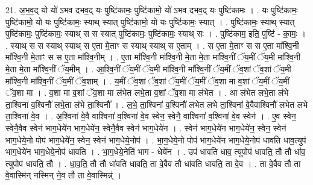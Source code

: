 \documentclass[17pt]{extarticle}
\begin{document}
21. अ॒भ॒व॒द् यो यो॑ ऽभव दभव॒द् यः पुष्टि॑कामः॒ पुष्टि॑कामो॒ यो॑ ऽभव दभव॒द् यः पुष्टि॑कामः । . यः पुष्टि॑कामः॒ पुष्टि॑कामो॒ यो यः पुष्टि॑कामः॒ स्याथ् स्यात् पुष्टि॑कामो॒ यो यः पुष्टि॑कामः॒ स्यात् । . पुष्टि॑कामः॒ स्याथ् स्यात् पुष्टि॑कामः॒ पुष्टि॑कामः॒ स्याथ् स स स्यात् पुष्टि॑कामः॒ पुष्टि॑कामः॒ स्याथ् सः । . पुष्टि॑काम॒ इति॒ पुष्टि॑ - का॒मः॒ । . स्याथ् स स स्याथ् स्याथ् स ए॒ता मे॒ताꣳ स स्याथ् स्याथ् स ए॒ताम् । . स ए॒ता मे॒ताꣳ स स ए॒ता मा᳚श्वि॒नी मा᳚श्वि॒नी मे॒ताꣳ स स ए॒ता मा᳚श्वि॒नीम् । . ए॒ता मा᳚श्वि॒नी मा᳚श्वि॒नी मे॒ता मे॒ता मा᳚श्वि॒नीं ॅय॒मीं ॅय॒मी मा᳚श्वि॒नी मे॒ता मे॒ता मा᳚श्वि॒नीं ॅय॒मीम् । . आ॒श्वि॒नीं ॅय॒मीं ॅय॒मी मा᳚श्वि॒नी मा᳚श्वि॒नीं ॅय॒मीं ॅव॒शां ॅव॒शां ॅय॒मी मा᳚श्वि॒नी मा᳚श्वि॒नीं ॅय॒मीं ॅव॒शाम् । . य॒मीं ॅव॒शां ॅव॒शां ॅय॒मीं ॅय॒मीं ॅव॒शा मा व॒शां ॅय॒मीं ॅय॒मीं ॅव॒शा मा । . व॒शा मा व॒शां ॅव॒शा मा ल॑भेत लभे॒ता व॒शां ॅव॒शा मा ल॑भेत । . आ ल॑भेत लभे॒ता ल॑भे ता॒श्विना॑ व॒श्विनौ॑ लभे॒ता ल॑भे ता॒श्विनौ᳚ । . ल॒भे॒ ता॒श्विना॑ व॒श्विनौ॑ लभेत लभे ता॒श्विना॑ वे॒वैवाश्विनौ॑ लभेत लभे ता॒श्विना॑ वे॒व । . अ॒श्विना॑ वे॒वै वाश्विना॑ व॒श्विना॑ वे॒व स्वेन॒ स्वेनै॒ वाश्विना॑ व॒श्विना॑ वे॒व स्वेन॑ । . ए॒व स्वेन॒ स्वेनै॒वैव स्वेन॑ भाग॒धेये॑न भाग॒धेये॑न॒ स्वेनै॒वैव स्वेन॑ भाग॒धेये॑न । . स्वेन॑ भाग॒धेये॑न भाग॒धेये॑न॒ स्वेन॒ स्वेन॑ भाग॒धेये॒नो पोप॑ भाग॒धेये॑न॒ स्वेन॒ स्वेन॑ भाग॒धेये॒नोप॑ । . भा॒ग॒धेये॒नो पोप॑ भाग॒धेये॑न भाग॒धेये॒नोप॑ धावति धाव॒त्युप॑ भाग॒धेये॑न भाग॒धेये॒नोप॑ धावति । . भा॒ग॒धेये॒नेति॑ भाग - धेये॑न । . उप॑ धावति धाव॒ त्युपोप॑ धावति॒ तौ तौ धा॑व॒ त्युपोप॑ धावति॒ तौ । . धा॒व॒ति॒ तौ तौ धा॑वति धावति॒ ता वे॒वैव तौ धा॑वति धावति॒ ता वे॒व । . ता वे॒वैव तौ ता वे॒वास्मि॑न् नस्मिन् ने॒व तौ ता वे॒वास्मिन्न्॑ । \newline
\end{document}
